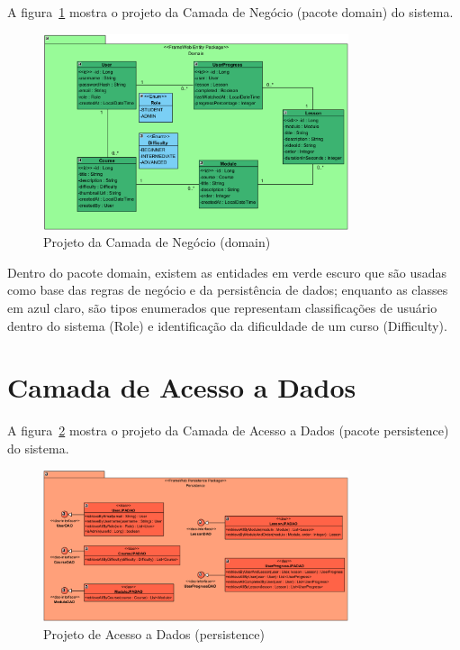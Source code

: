 
A figura~\ref{domain} mostra o projeto da Camada de Negócio (pacote \textsf{domain}) do sistema.

\begin{figure}[h]
	\centering
	\includegraphics[width=0.8\textwidth]{figuras/domain.png}
	\caption{Projeto da Camada de Negócio (\textsf{domain})}
	\label{domain}
\end{figure}

Dentro do pacote \textsf{domain}, existem as entidades em verde escuro que são usadas como base das regras de negócio e da persistência de dados; enquanto as classes em azul claro, são tipos enumerados que representam classificações de usuário dentro do sistema (\textsf{Role}) e identificação da dificuldade de um curso (\textsf{Difficulty}).

\section{Camada de Acesso a Dados}
\label{sec-frameweb-dados}


A figura~\ref{persistence} mostra o projeto da Camada de Acesso a Dados (pacote \textsf{persistence}) do sistema.

\begin{figure}[h]
	\centering
	\includegraphics[width=0.8\textwidth]{figuras/persistence.png}
	\caption{Projeto de Acesso a Dados (\textsf{persistence})}
	\label{persistence}
\end{figure}

